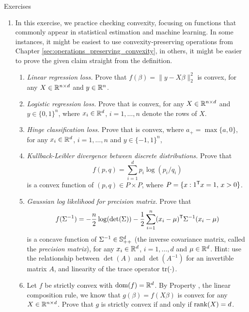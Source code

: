 \begin{xcb}{Exercises}
\begin{enumerate}[label=\thechapter.\arabic*]
\item \label{ex:loss_functions} 
  In this exercise, we practice checking convexity, focusing on functions that 
  commonly appear in statistical estimation and machine learning. In some 
  instances, it might be easiest to use convexity-preserving operations from 
  Chapter \ref{sec:operations_preserving_convexity}, in others, it might be
  easier to prove the given claim straight from the definition.

\begin{enumerate}[label=\alph*.]
\item \emph{Linear regression loss.} Prove that $f(\beta) = \|y -
  X \beta\|_2^2$ is convex, for any $X \in \mathbb{R}^{n \times d}$ and $y \in \mathbb{R}^n$.  

\item \emph{Logistic regression loss.} Prove that  is convex, for any $X \in 
  \mathbb{R}^{n \times d}$ and $y \in \{0,1\}^n$, where $x_i \in \mathbb{R}^d$, $i=1,\dots,n$  
  denote the rows of $X$.
  
\item \emph{Hinge classification loss.} Prove that  is convex, where $a_+ = \max\{a,
  0\}$, for any $x_i \in \mathbb{R}^d$, $i=1,\dots,n$ and $y \in \{-1,1\}^n$, 

\item \emph{Kullback-Leibler divergence between discrete distributions.} Prove
  that 
  \[
  f(p,q) = \sum_{i=1}^d p_i \log(p_i / q_i) 
  \]
  is a convex function of $(p,q) \in P \times P$, where $P = \{ x : 1^{\mathsf{T}} x =
  1, \, x > 0\}$.

\item \emph{Gaussian log likelihood for precision matrix.} Prove that 
  \[
  f(\Sigma^{-1}) = -\frac{n}{2} \log(\det(\Sigma)) - \frac{1}{2} \sum_{i=1}^n 
  (x_i-\mu)^{\mathsf{T}} \Sigma^{-1} (x_i-\mu)
  \]
  is a concave function of $\Sigma^{-1} \in \mathbb{S}_{++}^d$ (the inverse
  covariance matrix, called the \emph{precision matrix}), for any $x_i \in
  \mathbb{R}^d$, $i=1,\dots,d$ and $\mu \in \mathbb{R}^d$. Hint: use the relationship between 
  $\det(A)$ and $\det(A^{-1})$ for an invertible matrix $A$, and linearity of
  the trace operator $\operatorname{tr}(\cdot)$.  

\item Let $f$ be strictly convex with $\operatorname{dom}(f)=\mathbb{R}^d$. By Property
  , the linear composition rule, we know that  
  $g(\beta) = f(X \beta)$ is convex for any $X \in \mathbb{R}^{n \times d}$. Prove 
  that $g$ is strictly convex if and only if $\operatorname{rank}(X)=d$. 
\end{enumerate}


\end{enumerate}
\end{xcb}
